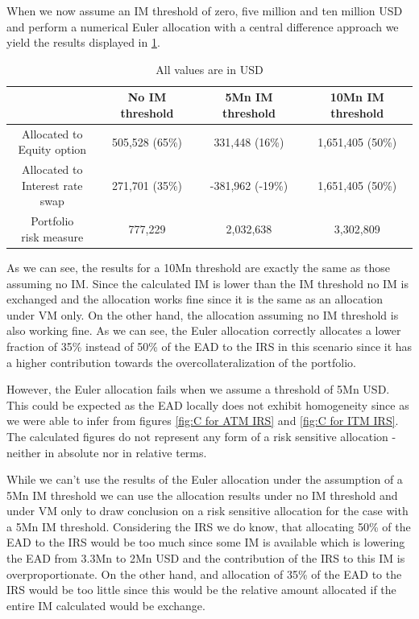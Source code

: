 \documentclass[../Thesis_AHoecherl.tex]{subfiles}
\begin{document}
    When we now assume an IM threshold of zero, five million and ten million USD and perform a numerical Euler allocation with a central difference approach we yield the results displayed in \ref{tab:IM threshold example allocated}.
    \begin{table}[htbp]
        \centering
        \begin{tabular}{c||c|c|c}
            & No IM threshold & 5Mn IM threshold & 10Mn IM threshold \\
            \toprule
            \makecell{Allocated to \\ Equity option} & 505,528 (65\%) & 331,448 (16\%) & 1,651,405 (50\%) \\
            \midrule
            \makecell{Allocated to \\ Interest rate swap}& 271,701 (35\%) & -381,962 (-19\%) & 1,651,405 (50\%) \\
            \bottomrule
            \makecell{Portfolio \\ risk measure} & 777,229 & 2,032,638 & 3,302,809 \\
        \end{tabular}%
        \caption{All values are in USD}
        \label{tab:IM threshold example allocated}
    \end{table}
    As we can see, the results for a 10Mn threshold are exactly the same as those assuming no IM. Since the calculated IM is lower than the IM threshold no IM is exchanged and the allocation works fine since it is the same as an allocation under VM only.
    On the other hand, the allocation assuming no IM threshold is also working fine. As we can see, the Euler allocation correctly allocates a lower fraction of 35\% instead of 50\% of the EAD to the IRS in this scenario since it has a higher contribution towards the overcollateralization of the portfolio.

    However, the Euler allocation fails when we assume a threshold of 5Mn USD. This could be expected as the EAD locally does not exhibit homogeneity since as we were able to infer from figures \ref{fig:C for ATM IRS} and \ref{fig:C for ITM IRS}. The calculated figures do not represent any form of a risk sensitive allocation - neither in absolute nor in relative terms.

    While we can't use the results of the Euler allocation under the assumption of a 5Mn IM threshold we can use the allocation results under no IM threshold and under VM only to draw conclusion on a risk sensitive allocation for the case with a 5Mn IM threshold.
    Considering the IRS we do know, that allocating 50\% of the EAD to the IRS would be too much since some IM is available which is lowering the EAD from 3.3Mn to 2Mn USD and the contribution of the IRS to this IM is overproportionate. On the other hand, and allocation of 35\% of the EAD to the IRS would be too little since this would be the relative amount allocated if the entire IM calculated would be exchange.
    
\end{document}

